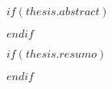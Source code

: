 %
%


$if(thesis.abstract)$
\begingroup
\renewcommand{\abovechapterskip}{\vspace*{10pt}}  %
  \renewcommand{\chapterbelowskip}{\vspace*{10pt}}  %
  \renewcommand{\chapteralign}{\centering}      %
  \renewcommand{\chapterfont}{\bfseries\Large}  %
\begin{abstract}
 \thispagestyle{empty}  
 
\end{abstract}
\newpage %
\endgroup
$endif$

$if(thesis.resumo)$
\begingroup
 \renewcommand{\abovechapterskip}{\vspace*{10pt}}  %
  \renewcommand{\chapterbelowskip}{\vspace*{10pt}}  %
  \renewcommand{\chapteralign}{\centering}      %
  \renewcommand{\chapterfont}{\bfseries\Large}  %
\begin{resumo}
 \thispagestyle{empty}  
 
\end{resumo}
\newpage %
\endgroup
$endif$





% 
% 
% 	

